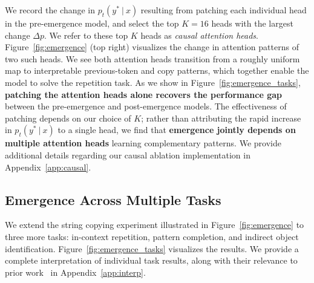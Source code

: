 \documentclass{article}
\newcommand{\given}{\ |\ }
\newcommand{\xxcomment}[4]{}
\newcommand{\vatsal}[1]{}
\newcommand{\xxcomment}[4]{\textcolor{#1}{[$^{\textsc{#2}}_{\textsc{#3}}$ #4]}}
\newcommand{\vatsal}[1]{\xxcomment{pinkypink}{V}{B}{#1}}
\begin{document}
We record the change in $p_t(y^*\given x)$ resulting from patching each individual head in the pre-emergence model, and select the top $K=16$ heads with the largest change $\Delta p$. We refer to these top $K$ heads as \textit{causal attention heads}. Figure~\ref{fig:emergence} (top right) visualizes the change in attention patterns of two such heads. We see both attention heads transition from a roughly uniform map to interpretable previous-token and copy patterns, which together enable the model to solve the repetition task. As we show in Figure~\ref{fig:emergence_tasks}, \textbf{patching the attention heads alone recovers the performance gap} between the pre-emergence and post-emergence models. The effectiveness of patching depends on our choice of $K$; rather than attributing the rapid increase in $p_t(y^*\given x)$ to a single head, we find that \textbf{emergence jointly depends on multiple attention heads} learning complementary patterns. We provide additional details regarding our causal ablation implementation in Appendix~\ref{app:causal}.



\subsection{Emergence Across Multiple Tasks}
We extend the string copying experiment illustrated in Figure~\ref{fig:emergence} to three more tasks: in-context repetition, pattern completion, and indirect object identification. Figure~\ref{fig:emergence_tasks} visualizes the results. We provide a complete interpretation of individual task results, along with their relevance to prior work~\citep{olsson2022incontextlearninginductionheads, michaud2024quantizationmodelneuralscaling, wang2022interpretabilitywildcircuitindirect} in Appendix~\ref{app:interp}.
\end{document}
